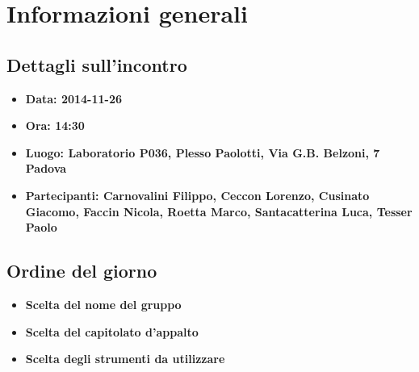 %

\section{Informazioni generali}

	\subsection{Dettagli sull'incontro}
		\begin{itemize}
  			\item \bfseries{Data:} \textnormal{2014-11-26}
  			\item \bfseries{Ora:} \textnormal{14:30}
  			\item \bfseries{Luogo:} \textnormal{Laboratorio P036, Plesso Paolotti, Via G.B. Belzoni, 7 Padova}
  			\item \bfseries{Partecipanti:} \textnormal{Carnovalini Filippo, Ceccon Lorenzo, Cusinato Giacomo, Faccin Nicola, Roetta Marco, Santacatterina Luca, Tesser Paolo}
		\end{itemize}
		
	\subsection{Ordine del giorno}
		\begin{itemize}
			\item \bfseries{Scelta del nome del gruppo}
			\item \bfseries{Scelta del capitolato d'appalto}
			\item \bfseries{Scelta degli strumenti da utilizzare}
		\end{itemize}


